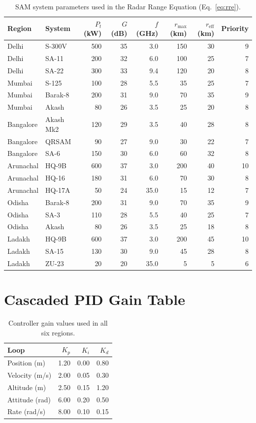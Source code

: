 \documentclass{article}
\begin{document}
\begin{table}[h]
\centering
\caption{SAM system parameters used in the Radar Range Equation (Eq.~\ref{eq:rre}).}
\small
\begin{tabular}{llrrrrrr}
\toprule
Region & System & $P_t$ (kW) & $G$ (dB) & $f$ (GHz) & $r_\text{max}$ (km) & $r_\text{eff}$ (km) & Priority \\
\midrule
Delhi & S-300V & 500 & 35 & 3.0 & 150 & 30 & 9 \\
Delhi & SA-11  & 200 & 32 & 6.0 & 100 & 25 & 7 \\
Delhi & SA-22  & 300 & 33 & 9.4 & 120 & 20 & 8 \\
Mumbai & S-125  & 100 & 28 & 5.5 &  35 & 25 & 7 \\
Mumbai & Barak-8 & 200 & 31 & 9.0 &  70 & 35 & 9 \\
Mumbai & Akash  &  80 & 26 & 3.5 &  25 & 20 & 8 \\
Bangalore & Akash Mk2 & 120 & 29 & 3.5 & 40 & 28 & 8 \\
Bangalore & QRSAM     &  90 & 27 & 9.0 & 30 & 22 & 7 \\
Bangalore & SA-6      & 150 & 30 & 6.0 & 60 & 32 & 8 \\
Arunachal & HQ-9B  & 600 & 37 & 3.0 & 200 & 40 & 10 \\
Arunachal & HQ-16  & 180 & 31 & 6.0 &  70 & 30 &  8 \\
Arunachal & HQ-17A &  50 & 24 & 35.0 &  15 & 12 &  7 \\
Odisha & Barak-8  & 200 & 31 & 9.0 &  70 & 35 & 9 \\
Odisha & SA-3     & 110 & 28 & 5.5 &  40 & 25 & 7 \\
Odisha & Akash    &  80 & 26 & 3.5 &  25 & 18 & 8 \\
Ladakh & HQ-9B  & 600 & 37 & 3.0 & 200 & 45 & 10 \\
Ladakh & SA-15  & 130 & 30 & 9.0 &  45 & 28 &  8 \\
Ladakh & ZU-23  &  20 & 20 & 35.0 &   5 &  5 &  6 \\
\bottomrule
\end{tabular}
\end{table}

\section{Cascaded PID Gain Table}
\label{app:pid_gains}

\begin{table}[h]
\centering
\caption{Controller gain values used in all six regions.}
\begin{tabular}{lrrr}
\toprule
Loop & $K_p$ & $K_i$ & $K_d$ \\
\midrule
Position (m)    & 1.20 & 0.00 & 0.80 \\
Velocity (m/s)  & 2.00 & 0.05 & 0.30 \\
Altitude (m)    & 2.50 & 0.15 & 1.20 \\
Attitude (rad)  & 6.00 & 0.20 & 0.50 \\
Rate (rad/s)    & 8.00 & 0.10 & 0.15 \\
\bottomrule
\end{tabular}
\end{table}
\end{document}
